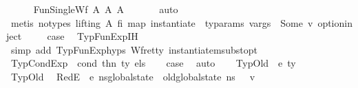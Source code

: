 \begin{isabellebody}
\ \ \ \ \isamarkupfalse%
\ FunSingleWf\ A{}\ A{}\ A{}\ \isanewline
\ \ \ \ \isamarkupfalse%
\ auto\isanewline
\ \ \ \ \isamarkupfalse%
\ {\isacharparenleft}{\kern0pt}metis\ {\isacharparenleft}{\kern0pt}no{\isacharunderscore}{\kern0pt}types{\isacharcomma}{\kern0pt}\ lifting{\isacharparenright}{\kern0pt}\ A{}\ {\isacartoucheopen}fi\ {\isacharparenleft}{\kern0pt}map\ {\isacharparenleft}{\kern0pt}instantiate\ {\isasymOmega}{\isacharparenright}{\kern0pt}\ ty{\isacharunderscore}{\kern0pt}params{\isacharparenright}{\kern0pt}\ vargs\ {\isacharequal}{\kern0pt}\ Some\ v{\isacartoucheclose}\ option{\isachardot}{\kern0pt}inject{\isacharparenright}{\kern0pt}\ \isanewline
\ \ \isamarkupfalse%
\ {\isacharquery}{\kern0pt}case\ \isamarkupfalse%
\ TypFunExp{\isachardot}{\kern0pt}IH{\isacharparenleft}{\kern0pt}{}{\isacharparenright}{\kern0pt}\isanewline
\ \ \ \ \isamarkupfalse%
\ {\isacharparenleft}{\kern0pt}simp\ add{\isacharcolon}{\kern0pt}\ TypFunExp{\isachardot}{\kern0pt}hyps{\isacharparenleft}{\kern0pt}{}{\isacharparenright}{\kern0pt}\ Wf{\isacharunderscore}{\kern0pt}ret{\isacharunderscore}{\kern0pt}ty\ instantiate{\isacharunderscore}{\kern0pt}msubst{\isacharunderscore}{\kern0pt}opt{\isacharparenright}{\kern0pt}\isanewline
{}\isamarkupfalse%
\isanewline
\ \ \isamarkupfalse%
\ {\isacharparenleft}{\kern0pt}TypCondExp\ {\isasymDelta}\ cond\ thn\ ty\ els{\isacharparenright}{\kern0pt}\isanewline
\ \ \isamarkupfalse%
\ {\isacharquery}{\kern0pt}case\ \isamarkupfalse%
\ auto\isanewline
{}\isamarkupfalse%
\isanewline
\ \ \isamarkupfalse%
\ {\isacharparenleft}{\kern0pt}TypOld\ {\isasymDelta}\ e\ ty{\isacharparenright}{\kern0pt}\isanewline
\ \ \isamarkupfalse%
\ TypOld\ \isamarkupfalse%
\ RedE{\isacharcolon}{\kern0pt}{\isachardoublequoteopen}{\isasymLambda}{\isacharcomma}{\kern0pt}{\isasymGamma}{\isacharcomma}{\kern0pt}{\isasymOmega}\ {\isasymturnstile}\ {\isasymlangle}e{\isacharcomma}{\kern0pt}\ n{\isacharunderscore}{\kern0pt}s{\isasymlparr}global{\isacharunderscore}{\kern0pt}state\ {\isacharcolon}{\kern0pt}{\isacharequal}{\kern0pt}\ old{\isacharunderscore}{\kern0pt}global{\isacharunderscore}{\kern0pt}state\ n{\isacharunderscore}{\kern0pt}s\ {\isasymrparr}{\isasymrangle}\ {\isasymDown}\ v{\isachardoublequoteclose}\ \isamarkupfalse%

\end{isabellebody}
